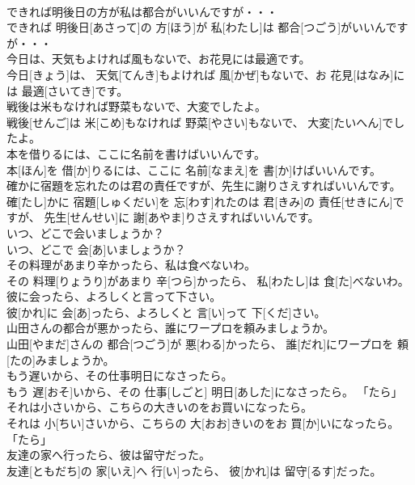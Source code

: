 \documentclass[8pt]{extreport}
\begin{document}
\begin{CJK}{UTF8}{min}
\\	できれば明後日の方が私は都合がいいんですが・・・	
\\	できれば 明後日[あさって]の 方[ほう]が 私[わたし]は 都合[つごう]がいいんですが・・・	
\\	今日は、天気もよければ風もないで、お花見には最適です。	
\\	今日[きょう]は、 天気[てんき]もよければ 風[かぜ]もないで、お 花見[はなみ]には 最適[さいてき]です。	
\\	戦後は米もなければ野菜もないで、大変でしたよ。	
\\	戦後[せんご]は 米[こめ]もなければ 野菜[やさい]もないで、 大変[たいへん]でしたよ。	
\\	本を借りるには、ここに名前を書けばいいんです。	
\\	本[ほん]を 借[か]りるには、ここに 名前[なまえ]を 書[か]けばいいんです。	
\\	確かに宿題を忘れたのは君の責任ですが、先生に謝りさえすればいいんです。	
\\	確[たし]かに 宿題[しゅくだい]を 忘[わす]れたのは 君[きみ]の 責任[せきにん]ですが、 先生[せんせい]に 謝[あやま]りさえすればいいんです。	
\\	いつ、どこで会いましょうか？	
\\	いつ、どこで 会[あ]いましょうか？	
\\	その料理があまり辛かったら、私は食べないわ。	
\\	その 料理[りょうり]があまり 辛[つら]かったら、 私[わたし]は 食[た]べないわ。	
\\	彼に会ったら、よろしくと言って下さい。	
\\	彼[かれ]に 会[あ]ったら、よろしくと 言[い]って 下[くだ]さい。	
\\	山田さんの都合が悪かったら、誰にワープロを頼みましょうか。	
\\	山田[やまだ]さんの 都合[つごう]が 悪[わる]かったら、 誰[だれ]にワープロを 頼[たの]みましょうか。	
\\	もう遅いから、その仕事明日になさったら。	
\\	もう 遅[おそ]いから、その 仕事[しごと] 明日[あした]になさったら。	「たら」
\\	それは小さいから、こちらの大きいのをお買いになったら。	
\\	それは 小[ちい]さいから、こちらの 大[おお]きいのをお 買[か]いになったら。	「たら」
\\	友達の家へ行ったら、彼は留守だった。	
\\	友達[ともだち]の 家[いえ]へ 行[い]ったら、 彼[かれ]は 留守[るす]だった。	

\end{CJK}
\end{document}
